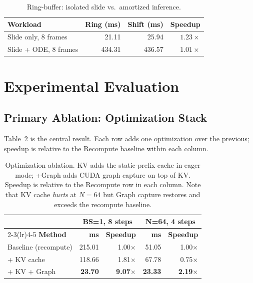 \documentclass[letterpaper,twocolumn,10pt]{article}
\begin{document}
\begin{table}[t]
\centering
\caption{Ring-buffer: isolated slide vs.\ amortized inference.}
\label{tab:ring}
\begin{tabular}{@{}lrrr@{}}
\toprule
\textbf{Workload} & \textbf{Ring (ms)} & \textbf{Shift (ms)} &
                   \textbf{Speedup} \\
\midrule
Slide only, 8 frames  & 21.11 & 25.94 & $1.23\times$ \\
Slide + ODE, 8 frames & 434.31 & 436.57 & $1.01\times$ \\
\bottomrule
\end{tabular}
\end{table}

\section{Experimental Evaluation}

\subsection{Primary Ablation: Optimization Stack}
\label{sec:ablation}

Table~\ref{tab:ablation} is the central result.  Each row adds one
optimization over the previous; speedup is relative to the
Recompute baseline within each column.

\begin{table}[t]
\centering
\caption{%
  Optimization ablation.  KV adds the static-prefix cache in eager
  mode; +Graph adds CUDA graph capture on top of KV.  Speedup is
  relative to the Recompute row in each column.  Note that KV cache
  \emph{hurts} at $N{=}64$ but Graph capture restores and
  exceeds the recompute baseline.
}
\label{tab:ablation}
\centering
\small
\begin{tabular}{@{}lrrrr@{}}
\toprule
& \multicolumn{2}{c}{\textbf{BS=1, 8 steps}} &
  \multicolumn{2}{c}{\textbf{N=64, 4 steps}} \\
\cmidrule(lr){2-3}\cmidrule(lr){4-5}
\textbf{Method} &
  \textbf{ms} & \textbf{Speedup} &
  \textbf{ms} & \textbf{Speedup} \\
\midrule
Baseline (recompute) & 215.01 & 1.00$\times$ & 51.05 & 1.00$\times$ \\
+ KV cache & 118.66 & 1.81$\times$ & 67.78 & 0.75$\times$ \\
+ KV + Graph & \textbf{23.70} & \textbf{9.07$\times$} & \textbf{23.33} & \textbf{2.19$\times$} \\
\bottomrule
\end{tabular}
\end{table}
\end{document}
